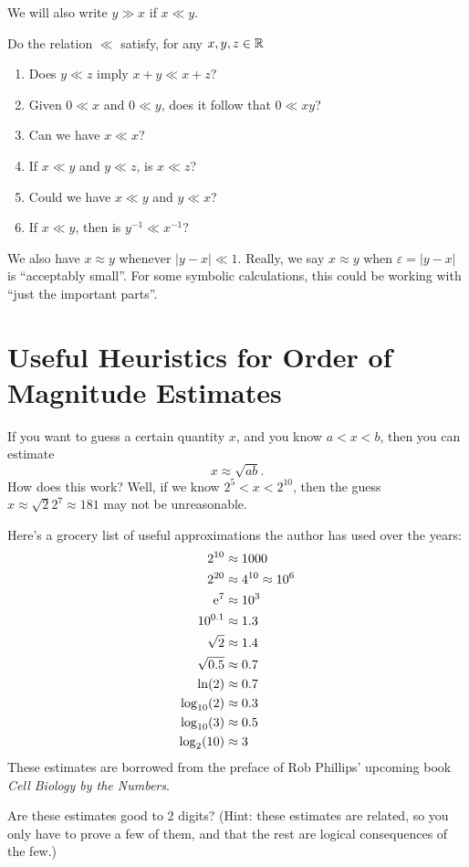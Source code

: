 We will also write $y\gg x$ if $x\ll y$.

 Do the relation $\ll$ satisfy, for any $x,y,z\in\mathbb{R}$
\begin{enumerate}
\item Does $y\ll z$ imply $x+y\ll x+z$?
\item Given $0\ll x$ and $0\ll y$, does it follow that $0\ll xy$?
\item Can we have $x\ll x$?
\item If $x\ll y$ and $y\ll z$, is $x\ll z$?
\item Could we have $x\ll y$ and $y\ll x$?
\item If $x\ll y$, then is $y^{-1}\ll x^{-1}$?
\end{enumerate}

We also have $x\approx y$ whenever $|y-x|\ll1$.
Really, we say $x\approx y$ when $\varepsilon=|y-x|$ is ``acceptably
small''. For some symbolic calculations, this could be working with
``just the important parts''.

\section{Useful Heuristics for Order of Magnitude Estimates}

If you want to guess a certain quantity $x$, and you know $a<x<b$, then
you can estimate
\begin{equation}
x\approx\sqrt{ab}.
\end{equation}
How does this work? Well, if we know $2^{5}<x<2^{10}$, then the guess
$x\approx \sqrt{2}2^{7}\approx 181$ may not be unreasonable.

Here's a grocery list of useful approximations the author has used over
the years:
\begin{align}
2^{10} &\approx 1000\\
2^{20} &\approx 4^{10}\approx 10^{6}\\
\mathrm{e}^{7} &\approx 10^{3}\\
10^{0.1} &\approx 1.3\\
\sqrt{2} &\approx 1.4\\
\sqrt{0.5} & \approx 0.7\\
\ln(2) &\approx 0.7\\
\log_{10}(2) &\approx 0.3\\
\log_{10}(3) &\approx 0.5\\
\log_{2}(10) &\approx 3
\end{align}
These estimates are borrowed from the preface of Rob Phillips' upcoming
book \emph{Cell Biology by the Numbers}.

\begin{xca}
Are these estimates good to 2 digits? (Hint: these estimates are
related, so you only have to prove a few of them, and that the rest are
logical consequences of the few.)
\end{xca}
